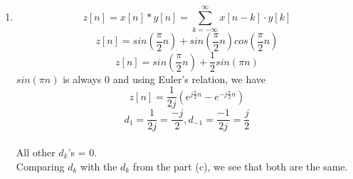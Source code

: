\documentclass[10pt,a4paper, margin=1in]{article}
\begin{document}
\begin{enumerate}
\begin{enumerate}
        \\\\
    \item %
        \[ z[n] = x[n] * y[n] = \sum_{k=-\infty}^{\infty} x[n - k] \cdot y[k] \]
        \[ z[n] = sin(\frac{\pi}{2}n) + sin(\frac{\pi}{2}n)cos(\frac{\pi}{2}n) \]
        \[ z[n] = sin(\frac{\pi}{2}n) + \frac{1}{2} sin(\pi n) \]
        $sin(\pi n)$ is always 0 and  using Euler's relation, we have
        \[ z[n] = \frac{1}{2j} (e^{j\frac{\pi}{2}n} -  e^{-j\frac{\pi}{2}n}) \]
        \[ d_1 = \frac{1}{2j} = \frac{-j}{2}, d_{-1} = \frac{-1}{2j}= \frac{j}{2}  \]
        \\All other $d_k$'s  = 0.
        \\Comparing $d_k$ with the $d_k$ from the part (c), we see that both are the same.
        \\\\
    \end{enumerate}
    

\end{enumerate}
\end{document}
